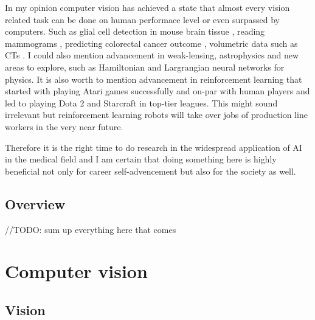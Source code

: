 \documentclass[a4paper,12pt]{article}
\begin{document}
\vspace{4mm}

\par In my opinion computer vision has achieved a state that almost every vision related task can be done on human performace level or even surpassed by computers. Such as glial cell detection in mouse brain tissue \cite{suleymanova2018deep}, reading mammograms  \cite{ribli2018detecting}, 
predicting colorectal cancer outcome \cite{skrede2020deep}, volumetric data such as CTs \cite{cciccek20163d}. I could also mention advancement in weak-lensing, astrophysics \cite{ribli2019improved} and new areas to explore, such as Hamiltonian \cite{greydanus2019hamiltonian} and Largrangian \cite{cranmer2020lagrangian} neural networks for physics. It is also worth to mention advancement in reinforcement learning that started with playing Atari games \cite{mnih2013playing} successfully and on-par with human players and led to playing Dota 2 and Starcraft \cite{alphastarblog} in top-tier leagues. This might sound irrelevant but reinforcement learning robots will take over jobs of production line workers \cite{satariano_metz_2020} in the very near future.

\vspace{4mm}

\par Therefore it is the right time to do research in the widespread application of AI in the medical field and I am certain that doing something here is highly beneficial not only for career self-advencement but also for the society as well. 

\vspace{7mm}

\subsection{Overview}

\vspace{7mm}

//TODO: sum up everything here that comes

\newpage

\section{Computer vision}

\vspace{7mm}

\subsection{Vision}
\end{document}
